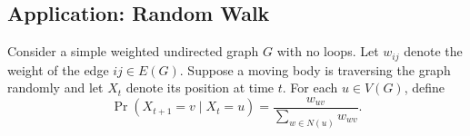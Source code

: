 \documentclass[math, code]{amznotes}
\theoremstyle{remark}
\begin{document}
\subsection{Application: Random Walk}
Consider a simple weighted undirected graph $G$ with no loops. Let $w_{ij}$ denote the weight of the edge $ij \in E\left(G\right)$. Suppose a moving body is traversing the graph randomly and let $X_t$ denote its position at time $t$. For each $u \in V\left(G\right)$, define 
\begin{equation*}
    \Pr\left(X_{t + 1} = v \mid X_t = u\right) = \frac{w_{uv}}{\sum_{w \in N\left(u\right)}w_{wv}}.
\end{equation*}
\end{document}
